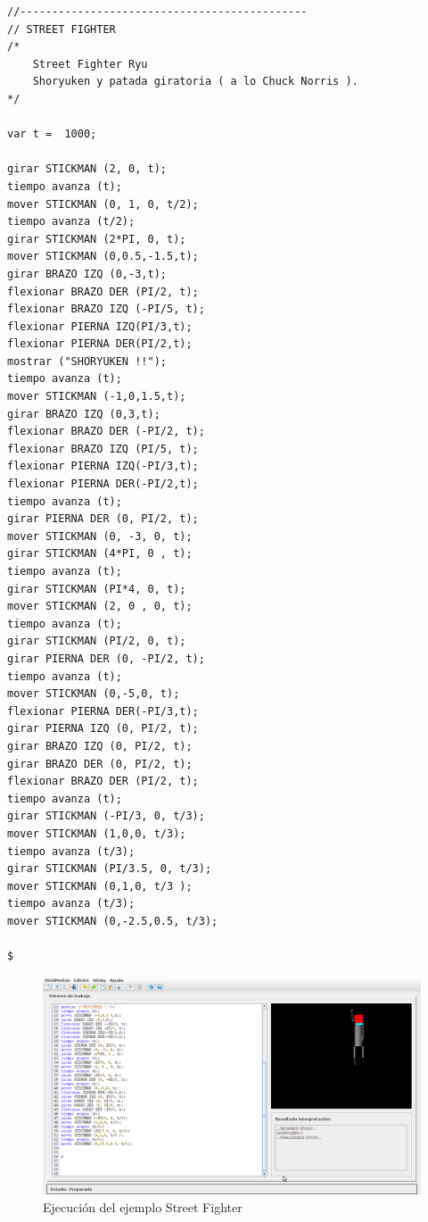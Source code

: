 \documentclass[a4paper, 12pt]{book}
\begin{document}
\begin{itemize}
  
  
\begin{verbatim}
//--------------------------------------------- 
// STREET FIGHTER 
/* 
    Street Fighter Ryu 
    Shoryuken y patada giratoria ( a lo Chuck Norris ). 
*/ 

var t =  1000; 

girar STICKMAN (2, 0, t); 
tiempo avanza (t); 
mover STICKMAN (0, 1, 0, t/2); 
tiempo avanza (t/2); 
girar STICKMAN (2*PI, 0, t); 
mover STICKMAN (0,0.5,-1.5,t); 
girar BRAZO IZQ (0,-3,t); 
flexionar BRAZO DER (PI/2, t); 
flexionar BRAZO IZQ (-PI/5, t); 
flexionar PIERNA IZQ(PI/3,t); 
flexionar PIERNA DER(PI/2,t); 
mostrar ("SHORYUKEN !!"); 
tiempo avanza (t); 
mover STICKMAN (-1,0,1.5,t); 
girar BRAZO IZQ (0,3,t); 
flexionar BRAZO DER (-PI/2, t); 
flexionar BRAZO IZQ (PI/5, t); 
flexionar PIERNA IZQ(-PI/3,t); 
flexionar PIERNA DER(-PI/2,t); 
tiempo avanza (t); 
girar PIERNA DER (0, PI/2, t); 
mover STICKMAN (0, -3, 0, t); 
girar STICKMAN (4*PI, 0 , t); 
tiempo avanza (t); 
girar STICKMAN (PI*4, 0, t); 
mover STICKMAN (2, 0 , 0, t); 
tiempo avanza (t); 
girar STICKMAN (PI/2, 0, t); 
girar PIERNA DER (0, -PI/2, t); 
tiempo avanza (t); 
mover STICKMAN (0,-5,0, t); 
flexionar PIERNA DER(-PI/3,t); 
girar PIERNA IZQ (0, PI/2, t); 
girar BRAZO IZQ (0, PI/2, t); 
girar BRAZO DER (0, PI/2, t); 
flexionar BRAZO DER (PI/2, t); 
tiempo avanza (t); 
girar STICKMAN (-PI/3, 0, t/3); 
mover STICKMAN (1,0,0, t/3); 
tiempo avanza (t/3); 
girar STICKMAN (PI/3.5, 0, t/3); 
mover STICKMAN (0,1,0, t/3 ); 
tiempo avanza (t/3); 
mover STICKMAN (0,-2.5,0.5, t/3); 

$
\end{verbatim}
  
  
  
  
  \begin{figure}[htb]
    \centerline{\includegraphics[width=\textwidth]{./imagenes/streetfighter1.png}}
    \caption{Ejecución del ejemplo Street Fighter}
\end{figure}



\end{itemize}
\end{document}
